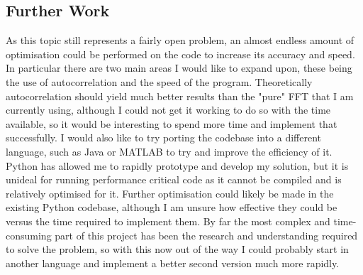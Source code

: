 \documentclass[12pt]{report}
\begin{document}
\subsection*{Further Work}
As this topic still represents a fairly open problem, an almost endless amount of optimisation could be performed on the code to increase its accuracy and speed. In particular there are two main areas I would like to expand upon, these being the use of autocorrelation and the speed of the program. Theoretically autocorrelation should yield much better results than the "pure" FFT that I am currently using, although I could not get it working to do so with the time available, so it would be interesting to spend more time and implement that successfully. I would also like to try porting the codebase into a different language, such as Java or MATLAB to try and improve the efficiency of it. Python has allowed me to rapidly prototype and develop my solution, but it is unideal for running performance critical code as it cannot be compiled and is relatively optimised for it. Further optimisation could likely be made in the existing Python codebase, although I am unsure how effective they could be versus the time required to implement them. By far the most complex and time-consuming part of this project has been the research and understanding required to solve the problem, so with this now out of the way I could probably start in another language and implement a better second version much more rapidly.

\end{document}
